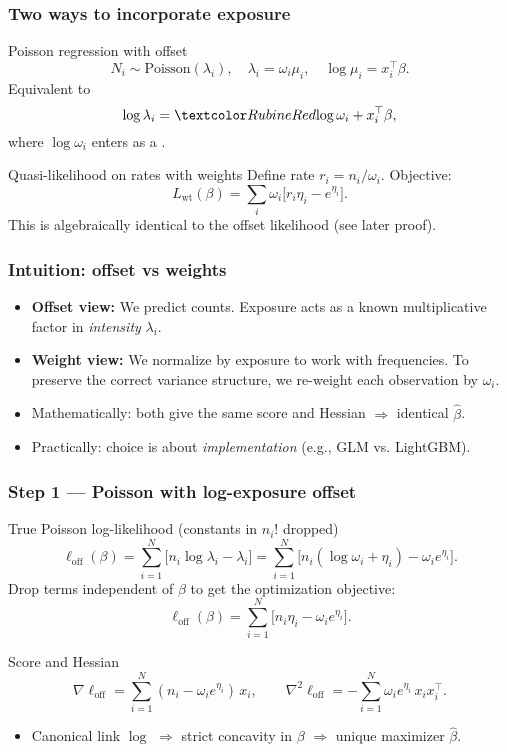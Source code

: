 \documentclass[10pt,aspectratio=169,xcolor={dvipsnames},usepdftitle=false]{beamer}
\begin{document}
\begin{frame}
\frametitle{Two ways to incorporate exposure}
\small
\begin{block}{Poisson regression with offset}
\[
N_i \sim \text{Poisson}(\lambda_i), \quad 
\lambda_i = \omega_i \mu_i, \quad
\log \mu_i = x_i^\top \beta.
\]
Equivalent to
\[
\log \lambda_i = \al{\log \omega_i} + x_i^\top \beta,
\]
where $\log \omega_i$ enters as a .
\end{block}

\begin{block}{Quasi-likelihood on rates with weights}
Define rate $r_i = n_i/\omega_i$.  
Objective:
\[
L_{\mathrm{wt}}(\beta) = \sum_i \omega_i \big[r_i \eta_i - e^{\eta_i}\big].
\]
This is algebraically identical to the offset likelihood (see later proof).
\end{block}
\end{frame}


\begin{frame}
\frametitle{Intuition: offset vs weights}
\small
\begin{itemize}
\item \textbf{Offset view:} We predict counts. Exposure acts as a known multiplicative factor in \emph{intensity} $\lambda_i$.
\item \textbf{Weight view:} We normalize by exposure to work with frequencies. To preserve the correct variance structure, we re-weight each observation by $\omega_i$.
\item Mathematically: both give the same score and Hessian $\Rightarrow$ identical $\hat\beta$.
\item Practically: choice is about \emph{implementation} (e.g., GLM vs. LightGBM).
\end{itemize}
\end{frame}


\begin{frame}
\frametitle{Step 1 — Poisson with log-exposure offset}
\small
\begin{exampleblock}{True Poisson log-likelihood (constants in $n_i!$ dropped)}
\[
\ell_{\mathrm{off}}(\beta)
= \sum_{i=1}^N \Big[n_i \log \lambda_i - \lambda_i\Big]
= \sum_{i=1}^N \Big[n_i(\log \omega_i + \eta_i) - \omega_i e^{\eta_i}\Big].
\]
Drop terms independent of $\beta$ to get the optimization objective: 
\[
\ell_{\mathrm{off}}(\beta)=\sum_{i=1}^N \Big[n_i \eta_i - \omega_i e^{\eta_i}\Big].
\]
\end{exampleblock}
\begin{block}{Score and Hessian}
\[
\nabla \ell_{\mathrm{off}}=\sum_{i=1}^N (n_i-\omega_i e^{\eta_i})\,x_i,\qquad
\nabla^2 \ell_{\mathrm{off}}=-\sum_{i=1}^N \omega_i e^{\eta_i}\,x_i x_i^\top.
\]
\end{block}
\begin{itemize}
\item Canonical link $\log$ $\Rightarrow$ strict concavity in $\beta$ $\Rightarrow$ unique maximizer $\hat\beta$.
\end{itemize}
\end{frame}
\end{document}
